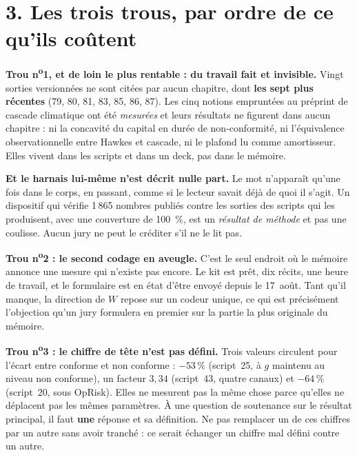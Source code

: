 \documentclass[11pt,a4paper]{article}
\begin{document}
\section*{3. Les trois trous, par ordre de ce qu'ils coûtent}

\begin{alerte}
\textbf{Trou n\textsuperscript{o}1, et de loin le plus rentable : du travail fait et invisible.}
Vingt sorties versionnées ne sont citées par aucun chapitre, dont \textbf{les sept plus récentes}
(79, 80, 81, 83, 85, 86, 87). Les cinq notions empruntées au préprint de cascade climatique ont
été \emph{mesurées} et leurs résultats ne figurent dans aucun chapitre : ni la concavité du
capital en durée de non-conformité, ni l'équivalence observationnelle entre Hawkes et cascade,
ni le plafond lu comme amortisseur. Elles vivent dans les scripts et dans un deck, pas dans le
mémoire.

\textbf{Et le harnais lui-même n'est décrit nulle part.} Le mot n'apparaît qu'une fois dans le
corps, en passant, comme si le lecteur savait déjà de quoi il s'agit. Un dispositif qui vérifie
1\,865 nombres publiés contre les sorties des scripts qui les produisent, avec une couverture de
100~\%, est un \emph{résultat de méthode} et pas une coulisse. Aucun jury ne peut le créditer
s'il ne le lit pas.
\end{alerte}

\begin{alerte}
\textbf{Trou n\textsuperscript{o}2 : le second codage en aveugle.} C'est le seul endroit où le
mémoire annonce une mesure qui n'existe pas encore. Le kit est prêt, dix récits, une heure de
travail, et le formulaire est en état d'être envoyé depuis le 17~août. Tant qu'il manque, la
direction de $W$ repose sur un codeur unique, ce qui est précisément l'objection qu'un jury
formulera en premier sur la partie la plus originale du mémoire.
\end{alerte}

\begin{alerte}
\textbf{Trou n\textsuperscript{o}3 : le chiffre de tête n'est pas défini.} Trois valeurs
circulent pour \og l'écart entre conforme et non conforme\fg{} : $-53\,\%$ (script~25, à $g$ maintenu
au niveau non conforme), un facteur $3{,}34$ (script~43, quatre canaux) et $-64\,\%$
(script~20, sous OpRisk). Elles ne mesurent pas la même chose parce qu'elles ne déplacent pas
les mêmes paramètres. À une question de soutenance sur le résultat principal, il faut
\textbf{une} réponse et sa définition. Ne pas remplacer un de ces chiffres par un autre sans
avoir tranché : ce serait échanger un chiffre mal défini contre un autre.
\end{alerte}
\end{document}
